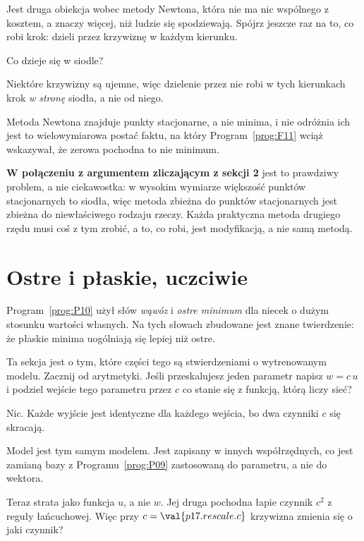 \begin{fr}
Jest druga obiekcja wobec metody Newtona, która nie ma nic wspólnego z kosztem,
a znaczy więcej, niż ludzie się spodziewają. Spójrz jeszcze raz na to, co robi
krok: dzieli przez krzywiznę w każdym kierunku.

Co dzieje się w siodle?
\dotline
\nextframe
\end{fr}

\begin{fr}
\begin{ansblock}
Niektóre krzywizny są ujemne, więc dzielenie przez nie robi w tych kierunkach
krok \emph{w stronę} siodła, a nie od niego.
\end{ansblock}

Metoda Newtona znajduje punkty stacjonarne, a nie minima, i nie odróżnia ich
\dash{} jest to wielowymiarowa postać faktu, na który
Program~\ref{prog:F11} wciąż wskazywał, że zerowa pochodna to nie minimum.

\textbf{W połączeniu z argumentem zliczającym z sekcji 2} jest to prawdziwy
problem, a nie ciekawostka: w wysokim wymiarze większość punktów stacjonarnych
to siodła, więc metoda zbieżna do punktów stacjonarnych jest zbieżna do
niewłaściwego rodzaju rzeczy. Każda praktyczna metoda drugiego rzędu musi coś
z tym zrobić, a to, co robi, jest modyfikacją, a nie samą metodą.
\end{fr}

\section{Ostre i płaskie, uczciwie}
\label{sec:P17-sharpness}

\begin{fr}
Program~\ref{prog:P10} użył słów \emph{wąwóz} i \emph{ostre minimum} dla
niecek o dużym stosunku wartości własnych. Na tych słowach zbudowane jest
znane twierdzenie: że płaskie minima uogólniają się lepiej niż ostre.

Ta sekcja jest o tym, które części tego są stwierdzeniami o wytrenowanym
modelu. Zacznij od arytmetyki. Jeśli przeskalujesz jeden parametr \dash{}
napisz $w = c\,u$ i podziel wejście tego parametru przez $c$ \dash{} co
stanie się z funkcją, którą liczy sieć?
\dotline
\nextframe
\end{fr}

\begin{fr}
\begin{ansblock}
Nic. Każde wyjście jest identyczne dla każdego wejścia, bo dwa czynniki $c$
się skracają.
\end{ansblock}

Model jest tym samym modelem. Jest zapisany w innych współrzędnych, co jest
zamianą bazy z Programu~\ref{prog:P09} zastosowaną do parametru, a nie do
wektora.

Teraz strata jako funkcja $u$, a nie $w$. Jej druga pochodna łapie czynnik
$c^{2}$ z reguły łańcuchowej. Więc przy $c = \val{p17.rescale.c}$ krzywizna
zmienia się o jaki czynnik?
\nextframe
\end{fr}

